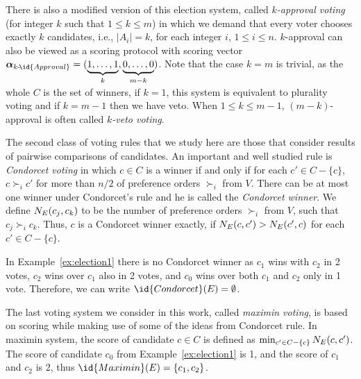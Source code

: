 There is also a modified version of this election system, called \emph{$k$-approval voting} (for integer $k$ such that $1\le k\le m$) in which we demand that every voter chooses exactly $k$ candidates, i.e., $|A_i|=k$, for each integer $i$, $1\le i\le n$.
$k$-approval can also be viewed as a scoring protocol with scoring vector $\boldsymbol\alpha_{k\text{-}\!\id{Approval}}=(\underbrace{1,\dots,1}_k,\underbrace{0,\dots,0}_{m-k})$.
Note that the case $k=m$ is trivial, as the whole $C$ is the set of winners, if $k=1$, this system is equivalent to plurality voting and if $k=m-1$ then we have veto.
When $1\le k\le m-1$, $(m-k)$-approval is often called \emph{$k$-veto voting}.

The second class of voting rules that we study here are those that consider results of pairwise comparisons of candidates.
An important and well studied rule is \emph{Condorcet voting} in which $c\in C$ is a winner if and only if for each $c'\in C-\{c\}$, $c\succ_i c'$ for more than $n/2$ of preference orders $\succ_i$ from $V$.
There can be at most one winner under Condorcet's rule and he is called the \emph{Condorcet winner}.
We define $N_{E}(c_j,c_k)$ to be the number of preference orders $\succ_i$ from $V$, such that $c_j\succ_i c_k$.
Thus, $c$ is a Condorcet winner exactly, if $N_{E}(c,c')>N_{E}(c',c)$ for each $c'\in C-\{c\}$.

In Example~\ref{ex:election1} there is no Condorcet winner as $c_1$ wins with $c_2$ in 2 votes, $c_2$ wins over $c_1$ also in 2 votes, and $c_0$ wins over both $c_1$ and $c_2$ only in 1 vote.
Therefore, we can write $\id{Condorcet}(E)=\emptyset$.

The last voting system we consider in this work, called \emph{maximin voting}, is based on scoring while making use of some of the ideas from Condorcet rule.
In maximin system, the score of candidate $c\in C$ is defined as $\min_{c'\in C-\{c\}}N_{E}(c,c')$.
The score of candidate $c_0$ from Example~\ref{ex:election1} is 1, and the score of $c_1$ and $c_2$ is 2, thus $\id{Maximin}(E)=\{c_1,c_2\}$.


